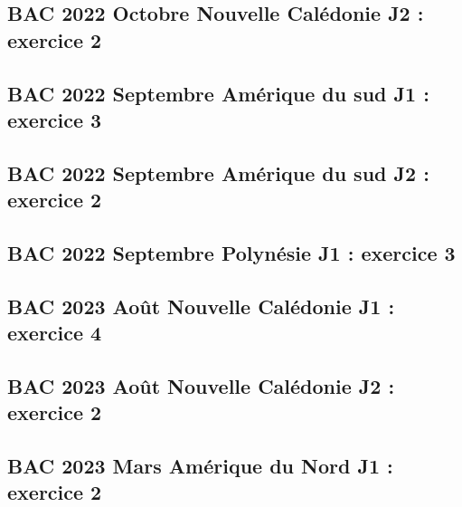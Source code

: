 \documentclass[lang=fr,edition=teacher,layout=sheet]{mxbook}
\begin{document}
\begingroup\endgroup
\par\bigskip
{}\subsection*{BAC 2022 Octobre Nouvelle Calédonie J2 : exercice 2}
\begingroup\endgroup
\par\bigskip
{}\subsection*{BAC 2022 Septembre Amérique du sud J1 : exercice 3}
\begingroup\endgroup
\par\bigskip
{}\subsection*{BAC 2022 Septembre Amérique du sud J2 : exercice 2}
\begingroup\endgroup
\par\bigskip
{}\subsection*{BAC 2022 Septembre Polynésie J1 : exercice 3}
\begingroup\endgroup
\par\bigskip
{}\subsection*{BAC 2023 Août Nouvelle Calédonie J1 : exercice 4}
\begingroup\endgroup
\par\bigskip
{}\subsection*{BAC 2023 Août Nouvelle Calédonie J2 : exercice 2}
\begingroup\endgroup
\par\bigskip
{}\subsection*{BAC 2023 Mars Amérique du Nord J1 : exercice 2}
\end{document}
